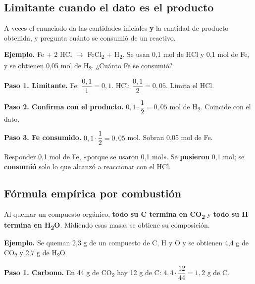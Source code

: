\subsection{Limitante cuando el dato es el producto}
A veces el enunciado da las cantidades iniciales \textbf{y} la cantidad de producto obtenida, y pregunta cuánto se consumió de un reactivo.

 

\textbf{Ejemplo.} Fe + 2 HCl \ensuremath{\rightarrow} FeCl\textsubscript{2} + H\textsubscript{2}. Se usan 0,1 mol de HCl y 0,1 mol de Fe, y se obtienen 0,05 mol de H\textsubscript{2}. ¿Cuánto Fe se consumió?

 

\textbf{Paso 1. Limitante.} Fe: $\dfrac{0{,}1}{1} = 0{,}1$. HCl: $\dfrac{0{,}1}{2} = 0{,}05$. Limita el HCl.

 

\textbf{Paso 2. Confirma con el producto.} $0{,}1\cdot\dfrac{1}{2} = 0{,}05$ mol de H\textsubscript{2}.  Coincide con el dato.

 

\textbf{Paso 3. Fe consumido.} $0{,}1\cdot\dfrac{1}{2} = 0{,}05$ mol. Sobran 0,05 mol de Fe.

  
 
\begin{ojo} Responder 0,1 mol de Fe, «porque se usaron 0,1 mol». Se \textbf{pusieron} 0,1 mol; se \textbf{consumió} solo lo que alcanzó a reaccionar con el HCl.\end{ojo}
\subsection{Fórmula empírica por combustión}
Al quemar un compuesto orgánico, \textbf{todo su C termina en CO\textsubscript{2}} y \textbf{todo su H termina en H\textsubscript{2}O}. Midiendo esas masas se obtiene su composición.

 

\textbf{Ejemplo.} Se queman 2,3 g de un compuesto de C, H y O y se obtienen 4,4 g de CO\textsubscript{2} y 2,7 g de H\textsubscript{2}O.

 

\textbf{Paso 1. Carbono.} En 44 g de CO\textsubscript{2} hay 12 g de C: $4{,}4\cdot\dfrac{12}{44} = 1{,}2$ g de C.

